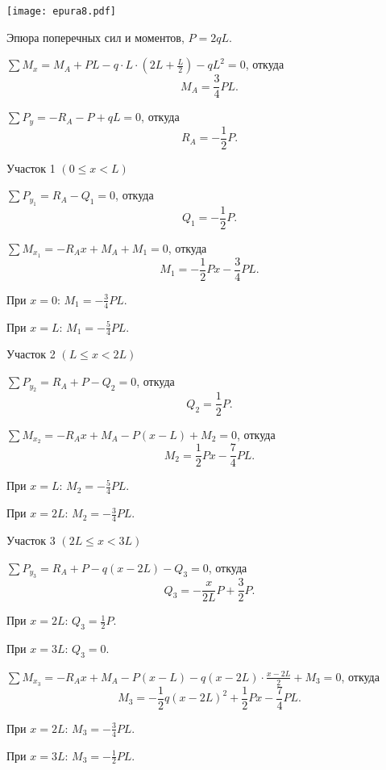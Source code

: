 \begin{floatingfigure}[r]{0.5\textwidth}
    \centering
    \texttt{[image: epura8.pdf]}
    \caption{Эпюра поперечных сил и моментов, $P = 2 q L$.}
    \label{fig:chap1-epura8}
\end{floatingfigure}

$\sum M_x = M_A + PL - q \cdot L \cdot \left(2L + \frac{L}{2}\right) - qL^2 = 0$,
откуда
\[
    M_A = \frac{3}{4}PL.
\]

$\sum P_y = -R_A - P + qL = 0$,
откуда
\[
    R_A = -\frac{1}{2}P.
\]

\vspace{1.5ex}

Участок 1 $\left(0 \le x < L\right)$

$\sum P_{y_1} = R_A - Q_1 = 0$,
откуда
\[
    Q_1 = -\frac{1}{2}P.
\]

$\sum M_{x_1} = -R_A x + M_A + M_1 = 0$,
откуда
\[
    M_1 = -\frac{1}{2}Px - \frac{3}{4}PL.
\]

При $x = 0$: $M_1 = -\frac{3}{4}PL$.

При $x = L$: $M_1 = -\frac{5}{4}PL$.

\vspace{1.5ex}

Участок 2 $\left(L \le x < 2L\right)$

$\sum P_{y_2} = R_A + P - Q_2 = 0$,
откуда
\[
    Q_2 = \frac{1}{2}P.
\]

$\sum M_{x_2} = -R_A x + M_A - P(x - L) + M_2 = 0$,
откуда
\[
    M_2 = \frac{1}{2}Px - \frac{7}{4}PL.
\]

При $x = L$: $M_2 = -\frac{5}{4}PL$.

При $x = 2L$: $M_2 = -\frac{3}{4}PL$.

\vspace{1.5ex}

Участок 3 $\left(2L \le x < 3L\right)$

$\sum P_{y_3} = R_A + P - q(x - 2L) - Q_3 = 0$,
откуда
\[
    Q_3 = -\frac{x}{2L}P + \frac{3}{2}P.
\]

При $x = 2L$: $Q_3 = \frac{1}{2}P$.

При $x = 3L$: $Q_3 = 0$.

$\sum M_{x_3} = -R_A x + M_A - P(x - L) - q(x - 2L) \cdot \frac{x-2L}{2} + M_3 = 0$,
откуда
\[
    M_3 = -\frac{1}{2}q(x - 2L)^2 + \frac{1}{2}Px - \frac{7}{4}PL.
\]

При $x = 2L$: $M_3 = -\frac{3}{4}PL$.

При $x = 3L$: $M_3 = -\frac{1}{2}PL$.

